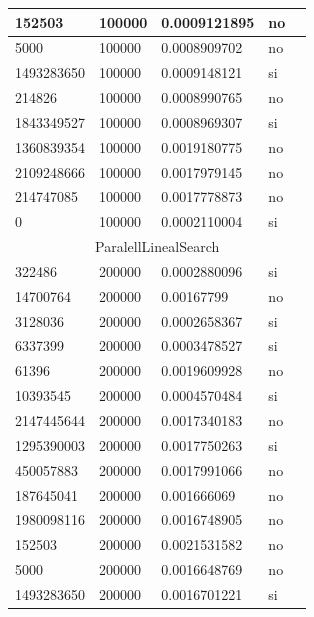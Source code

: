 \documentclass[12pt, fleqn]{article}                             %
\theoremstyle{break}                                            %
\begin{document}
\begin{longtable}{|m{5em}|m{5em}|m{10em}|m{5em}|@{}m{0pt}@{}}
            152503& 100000  & 0.0009121895 & no &\\[1em]    \hline
            5000& 100000  & 0.0008909702 & no &\\[1em]    \hline
            1493283650& 100000  & 0.0009148121 & si &\\[1em]    \hline
            214826& 100000  & 0.0008990765 & no &\\[1em]    \hline
            1843349527& 100000  & 0.0008969307 & si &\\[1em]    \hline
            1360839354& 100000  & 0.0019180775 & no &\\[1em]    \hline
            2109248666& 100000  & 0.0017979145 & no &\\[1em]    \hline
            214747085& 100000  & 0.0017778873 & no &\\[1em]    \hline
            0& 100000  & 0.0002110004 & si &\\[1em]    \hline
            \multicolumn{5}{|c|}{ParalellLinealSearch}   \\          \hline
            322486& 200000  & 0.0002880096 & si &\\[1em]    \hline
            14700764& 200000  & 0.00167799 & no &\\[1em]    \hline
            3128036& 200000  & 0.0002658367 & si &\\[1em]    \hline
            6337399& 200000  & 0.0003478527 & si &\\[1em]    \hline
            61396& 200000  & 0.0019609928 & no &\\[1em]    \hline
            10393545& 200000  & 0.0004570484 & si &\\[1em]    \hline
            2147445644& 200000  & 0.0017340183 & no &\\[1em]    \hline
            1295390003& 200000  & 0.0017750263 & si &\\[1em]    \hline
            450057883& 200000  & 0.0017991066 & no &\\[1em]    \hline
            187645041& 200000  & 0.001666069 & no &\\[1em]    \hline
            1980098116& 200000  & 0.0016748905 & no &\\[1em]    \hline
            152503& 200000  & 0.0021531582 & no &\\[1em]    \hline
            5000& 200000  & 0.0016648769 & no &\\[1em]    \hline
            1493283650& 200000  & 0.0016701221 & si &\\[1em]    \hline

\end{longtable}
\end{document}
